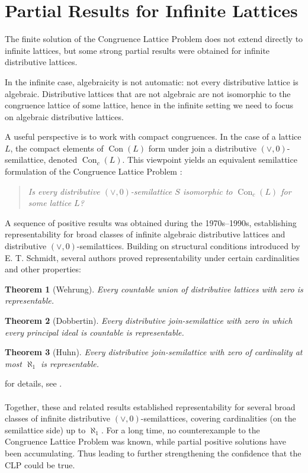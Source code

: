 ﻿\documentclass{article}
\newtheorem{theorem}{Theorem}[section]
\begin{document}
\section{Partial Results for Infinite Lattices}

The finite solution of the Congruence Lattice Problem does not extend directly to infinite lattices, but some strong partial results were obtained for infinite distributive lattices.

In the infinite case, algebraicity is not automatic: not every distributive lattice is algebraic. Distributive lattices that are not algebraic are not isomorphic to the congruence lattice of some lattice, hence in the infinite setting we need to focus on algebraic distributive lattices.

A useful perspective is to work with compact congruences.
In the case of a lattice $L$, the compact elements of $\operatorname{Con}(L)$ form under join
a distributive $(\vee,0)$-semilattice, denoted $\operatorname{Con}_c(L)$.
This viewpoint yields an equivalent semilattice formulation of the Congruence Lattice Problem \cite{Wehrung2007AdvMath}:
\begin{quote}
\textit{Is every distributive $(\vee,0)$-semilattice $S$ isomorphic to $\operatorname{Con}_c(L)$ for some lattice $L$?}
\end{quote}

A sequence of positive results was obtained during the 1970s--1990s, establishing representability for broad classes of infinite algebraic distributive lattices and distributive $(\vee,0)$-semilattices.
Building on structural conditions introduced by E. T. Schmidt, several authors proved representability under certain cardinalities and other properties:

\begin{theorem}[Wehrung]
Every countable union of distributive lattices with zero is representable.
\end{theorem}

\begin{theorem}[Dobbertin]
Every distributive join-semilattice with zero in which every principal ideal is countable is representable.
\end{theorem}

\begin{theorem}[Huhn]
Every distributive join-semilattice with zero of cardinality at most $\aleph_1$ is representable.
\end{theorem}

for details, see \cite[p.~705]{Gratzer2007TwoProblems}.
\\ \\
Together, these and related results established representability for several broad classes of infinite distributive $(\vee,0)$-semilattices, covering cardinalities (on the semilattice side) up to $\aleph_1$. For a long time, no counterexample to the Congruence Lattice Problem was known, while partial positive solutions have been accumulating. Thus leading to further strengthening the confidence that the CLP could be true.
\end{document}
